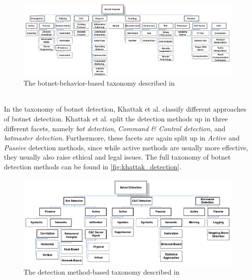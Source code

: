 \documentclass[a4paper,10pt]{article}
\begin{document}
\begin{figure}[hbtp]
 \centering
 \includegraphics[width=0.9\linewidth]{khattak-behavior.png}
 \caption{The botnet-behavior-based taxonomy described in \cite{Khattak2014}}
 \label{fig:khattak_behavior}
\end{figure}
~\\
In the taxonomy of botnet detection, Khattak et al. classify different approaches of botnet detection. Khattak et al. 
split the detection methods up in three different facets, namely \textit{bot detection}, \textit{Command \& Control
detection}, and \textit{botmaster detection}. Furthermore, these facets are again split up in \textit{Active} and 
\textit{Passive} detection methods, since while active methods are usually more effective, they usually also raise
ethical and legal issues. The full taxonomy of botnet detection methods can be found in \autoref{fig:khattak_detection}.
\\
\begin{figure}[hbtp]
 \centering
 \includegraphics[width=0.9\linewidth]{khattak-detection.png}
 \caption{The detection method-based taxonomy described in \cite{Khattak2014}}
 \label{fig:khattak_detection}
\end{figure}
\end{document}
